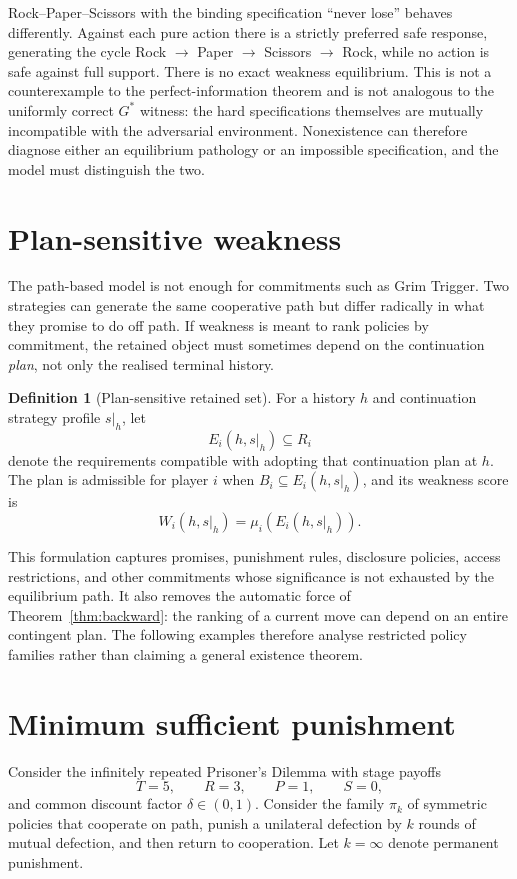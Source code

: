 \documentclass[11pt]{article}
\theoremstyle{definition}
\newtheorem{definition}[theorem]{Definition}
\begin{document}
Rock--Paper--Scissors with the binding specification ``never lose'' behaves differently. Against each pure action there is a strictly preferred safe response, generating the cycle Rock $\to$ Paper $\to$ Scissors $\to$ Rock, while no action is safe against full support. There is no exact weakness equilibrium. This is not a counterexample to the perfect-information theorem and is not analogous to the uniformly correct $G^*$ witness: the hard specifications themselves are mutually incompatible with the adversarial environment. Nonexistence can therefore diagnose either an equilibrium pathology or an impossible specification, and the model must distinguish the two.

\section{Plan-sensitive weakness}

The path-based model is not enough for commitments such as Grim Trigger. Two strategies can generate the same cooperative path but differ radically in what they promise to do off path. If weakness is meant to rank policies by commitment, the retained object must sometimes depend on the continuation \emph{plan}, not only the realised terminal history.

\begin{definition}[Plan-sensitive retained set]
For a history $h$ and continuation strategy profile $s|_h$, let
\[
E_i(h,s|_h)\subseteq R_i
\]
denote the requirements compatible with adopting that continuation plan at $h$. The plan is admissible for player $i$ when $B_i\subseteq E_i(h,s|_h)$, and its weakness score is
\[
W_i(h,s|_h)=\mu_i(E_i(h,s|_h)).
\]
\end{definition}

This formulation captures promises, punishment rules, disclosure policies, access restrictions, and other commitments whose significance is not exhausted by the equilibrium path. It also removes the automatic force of Theorem~\ref{thm:backward}: the ranking of a current move can depend on an entire contingent plan. The following examples therefore analyse restricted policy families rather than claiming a general existence theorem.

\section{Minimum sufficient punishment}

Consider the infinitely repeated Prisoner's Dilemma with stage payoffs
\[
T=5,\qquad R=3,\qquad P=1,\qquad S=0,
\]
and common discount factor $\delta\in(0,1)$. Consider the family $\pi_k$ of symmetric policies that cooperate on path, punish a unilateral defection by $k$ rounds of mutual defection, and then return to cooperation. Let $k=\infty$ denote permanent punishment.
\end{document}
